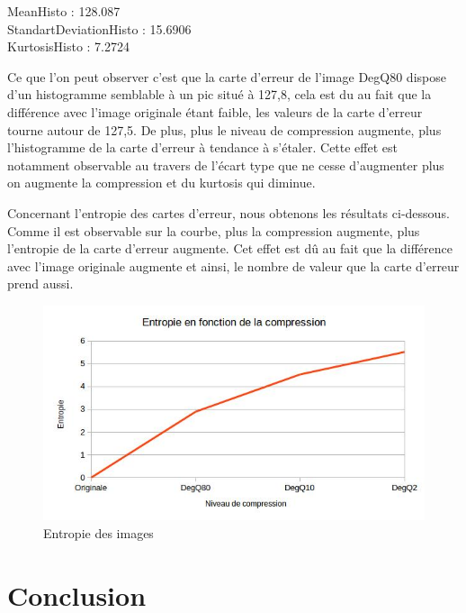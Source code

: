 \documentclass[12pt]{report}
\begin{document}
\begin{center}
MeanHisto : 128.087\\
StandartDeviationHisto : 15.6906\\
KurtosisHisto : 7.2724
\end{center}

Ce que l'on peut observer c'est que la carte d'erreur de l'image DegQ80 dispose d'un histogramme semblable à un pic situé à 127,8, cela est du au fait que la différence avec l'image originale étant faible, les valeurs de la carte d'erreur tourne autour de 127,5. De plus, plus le niveau de compression augmente, plus l'histogramme de la carte d'erreur à tendance à s'étaler. Cette effet est notamment observable au travers de l'écart type que ne cesse d'augmenter plus on augmente la compression et du kurtosis qui diminue.

\newpage
Concernant l'entropie des cartes d'erreur, nous obtenons les résultats ci-dessous. Comme il est observable sur la courbe, plus la compression augmente, plus l'entropie de la carte d'erreur augmente. Cet effet est dû au fait que la différence avec l'image originale augmente et ainsi, le nombre de valeur que la carte d'erreur prend aussi.

\begin{figure}[H]
\begin{center}
\includegraphics[scale=0.8]{../ImageRes/entropie_erreur.jpg} 
\caption{Entropie des images}
\end{center}
\end{figure}

\section{Conclusion}

\newpage



\renewcommand*\listfigurename{\large Liste des figures}
\listoffigures
\newpage
\end{document}
